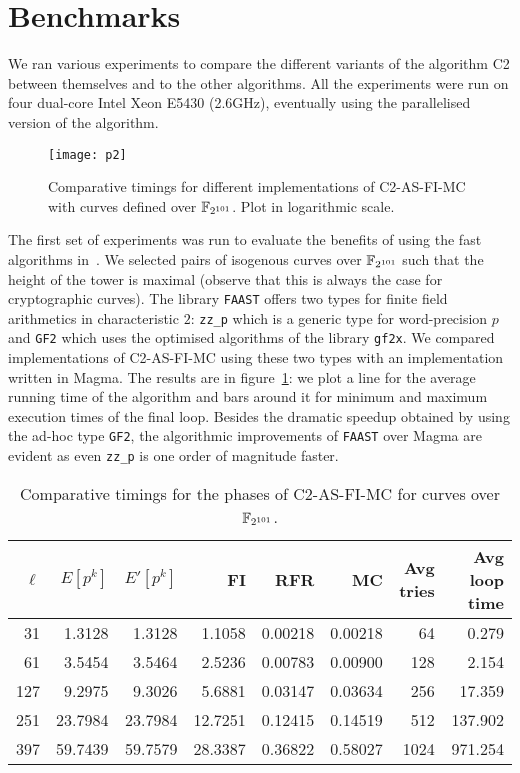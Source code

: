 \section{Benchmarks}
\label{sec:benchmarks}
We ran various experiments to compare the different variants of the
algorithm C2 between themselves and to the other algorithms. All the
experiments were run on four dual-core Intel Xeon E5430 (2.6GHz),
eventually using the parallelised version of the algorithm.

\begin{figure}
  \centering
  \texttt{[image: p2]}
  \caption{Comparative timings for different implementations of C2-AS-FI-MC with curves defined over $\mathbb{F}_{2^{101}}$. Plot in logarithmic scale.}
  \label{fig:2-101}
\end{figure}

The first set of experiments was run to evaluate the benefits of using
the fast algorithms in~\cite{DFS09}. We selected pairs of isogenous
curves over $\mathbb{F}_{2^{101}}$ such that the height of the tower is
maximal (observe that this is always the case for cryptographic
curves). The library \texttt{FAAST} offers two types for finite field
arithmetics in characteristic $2$: \texttt{zz\_p} which is a generic
type for word-precision $p$ and \texttt{GF2} which uses the optimised
algorithms of the library \texttt{gf2x}. We compared implementations
of C2-AS-FI-MC using these two types with an implementation written in
Magma. The results are in figure~\ref{fig:2-101}: we plot a line for
the average running time of the algorithm and bars around it for
minimum and maximum execution times of the final loop. Besides the
dramatic speedup obtained by using the ad-hoc type \texttt{GF2}, the
algorithmic improvements of \texttt{FAAST} over Magma are evident as
even \texttt{zz\_p} is one order of magnitude faster.

\begin{table}
  \centering
  \begin{tabular}{r r r r r r r r}
    \hline
    $\ell$ & $E[p^k]$ & $E'[p^k]$ & FI & RFR & MC & Avg tries & Avg loop time\\
    \hline
    31 & 1.3128 & 1.3128 & 1.1058 & 0.00218 & 0.00218 & 64 & 0.279\\
    61 & 3.5454 & 3.5464 & 2.5236 & 0.00783 & 0.00900 & 128 & 2.154 \\
    127 & 9.2975 & 9.3026 & 5.6881 & 0.03147 & 0.03634 & 256 & 17.359 \\
    251	& 23.7984 & 23.7984 & 12.7251 & 0.12415 & 0.14519 & 512 & 137.902 \\
    397 & 59.7439 & 59.7579 & 28.3387 & 0.36822 & 0.58027 & 1024 & 971.254 \\
    \hline
  \end{tabular}
  \caption{Comparative timings for the phases of C2-AS-FI-MC for curves over $\mathbb{F}_{2^{101}}$.}
  \label{tab:C2}
\end{table}

